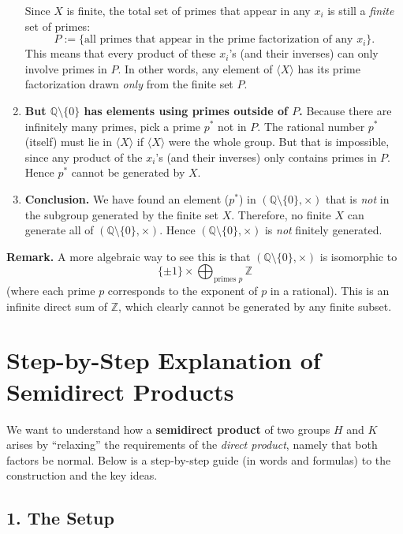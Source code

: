 \documentclass[12pt]{article}
\theoremstyle{definition} %
\theoremstyle{plain} %
\begin{document}
\begin{enumerate}
    Since $X$ is finite, the total set of primes that appear in any $x_i$ is still a \emph{finite} set of primes:
    \[
      P := \{\text{all primes that appear in the prime factorization of any } x_i\}.
    \]
    This means that every product of these $x_i$'s (and their inverses) can only involve primes in $P$.  
    In other words, any element of $\langle X\rangle$ has its prime factorization drawn \emph{only} from the finite set $P$.

    \item \textbf{But $\mathbb{Q}\setminus\{0\}$ has elements using primes outside of $P$.}
    Because there are infinitely many primes, pick a prime $p^*$ not in $P$. The rational number $p^*$ (itself) must lie in $\langle X\rangle$ if $\langle X\rangle$ were the whole group.  But that is impossible, since any product of the $x_i$'s (and their inverses) only contains primes in $P$.  Hence $p^*$ cannot be generated by $X$.

    \item \textbf{Conclusion.}
    We have found an element ($p^*$) in $(\mathbb{Q}\setminus\{0\},\times)$ that is \emph{not} in the subgroup generated by the finite set $X$.  Therefore, no finite $X$ can generate all of $(\mathbb{Q}\setminus\{0\},\times)$.  Hence $(\mathbb{Q}\setminus\{0\}, \times)$ is \emph{not} finitely generated.

\end{enumerate}

\noindent
\textbf{Remark.}
A more algebraic way to see this is that $(\mathbb{Q}\setminus\{0\}, \times)$ is isomorphic to 
\[
\{\pm 1\} \times \bigoplus_{\text{primes }p} \mathbb{Z}
\]
(where each prime $p$ corresponds to the exponent of $p$ in a rational).  This is an infinite direct sum of $\mathbb{Z}$, which clearly cannot be generated by any finite subset.

\section*{Step-by-Step Explanation of Semidirect Products}

We want to understand how a \textbf{semidirect product} of two groups $H$ and $K$ arises by
``relaxing'' the requirements of the \emph{direct product}, namely that both factors be normal. 
Below is a step-by-step guide (in words and formulas) to the construction and the key ideas.

\subsection*{1. The Setup}
\end{document}
